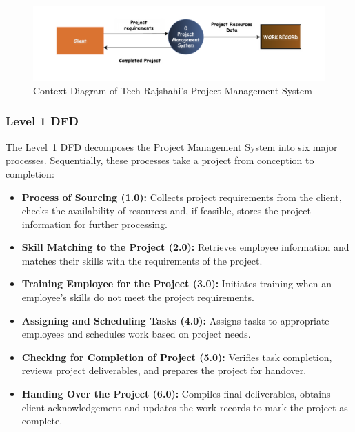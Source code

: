 \documentclass[12pt,a4paper]{article}
\begin{document}
\begin{figure}[H]
    \centering
    \includegraphics[width=\textwidth]{Fig/context_dfd.png}
    \caption{Context Diagram of Tech Rajshahi's Project Management System}
    \label{fig:context_dfd}
\end{figure}

\subsubsection{Level 1 DFD}
The Level~1 DFD decomposes the Project Management System into six major processes. Sequentially, these processes take a project from conception to completion:

\begin{itemize}
    \item \textbf{Process of Sourcing (1.0):} Collects project requirements from the client, checks the availability of resources and, if feasible, stores the project information for further processing.
    \item \textbf{Skill Matching to the Project (2.0):} Retrieves employee information and matches their skills with the requirements of the project.
    \item \textbf{Training Employee for the Project (3.0):} Initiates training when an employee’s skills do not meet the project requirements.
    \item \textbf{Assigning and Scheduling Tasks (4.0):} Assigns tasks to appropriate employees and schedules work based on project needs.
    \item \textbf{Checking for Completion of Project (5.0):} Verifies task completion, reviews project deliverables, and prepares the project for handover.
    \item \textbf{Handing Over the Project (6.0):} Compiles final deliverables, obtains client acknowledgement and updates the work records to mark the project as complete.
\end{itemize}
\end{document}
